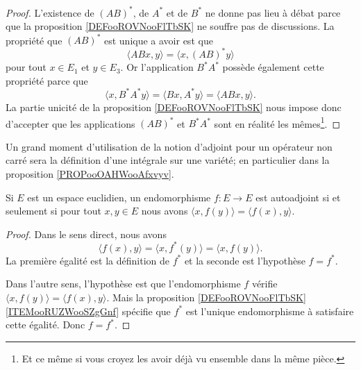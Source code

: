 \begin{proof}
	L'existence de \( (AB)^*\), de \( A^*\) et de \( B^*\) ne donne pas lieu à débat parce que la proposition \ref{DEFooROVNooFlTbSK} ne souffre pas de discussions. La propriété que \( (AB)^*\) est unique a avoir est que
	\begin{equation}
		\langle ABx, y\rangle =\langle x, (AB)^*y\rangle
	\end{equation}
	pour tout \( x\in E_1\) et \( y\in E_3\). Or l'application \( B^*A^*\) possède également cette propriété parce que
	\begin{equation}
		\langle x, B^*A^*y\rangle =\langle Bx, A^*y\rangle =\langle ABx, y\rangle .
	\end{equation}
	La partie unicité de la proposition \ref{DEFooROVNooFlTbSK} nous impose donc d'accepter que les applications \( (AB)^*\) et \( B^*A^*\) sont en réalité les mêmes\footnote{Et ce même si vous croyez les avoir déjà vu ensemble dans la même pièce.}.
\end{proof}

\begin{normaltext}
	Un grand moment d'utilisation de la notion d'adjoint pour un opérateur non carré sera la définition d'une intégrale sur une variété; en particulier dans la proposition \ref{PROPooOAHWooAfxvyv}.
\end{normaltext}

\begin{lemma}
	Si \( E\) est un espace euclidien, un endomorphisme \( f\colon E\to E\) est autoadjoint si et seulement si pour tout \( x,y\in E\) nous avons \( \langle x, f(y)\rangle=\langle f(x), y\rangle  \).
\end{lemma}

\begin{proof}
	Dans le sens direct, nous avons
	\begin{equation}
		\langle f(x), y\rangle =\langle x, f^*(y)\rangle =\langle x, f(y)\rangle .
	\end{equation}
	La première égalité est la définition de \( f^*\) et la seconde est l'hypothèse \( f=f^*\).

	Dans l'autre sens, l'hypothèse est que l'endomorphisme \( f\) vérifie \( \langle x, f(y)\rangle =\langle f(x), y\rangle \). Mais la proposition \ref{DEFooROVNooFlTbSK}\ref{ITEMooRUZWooSZgGnf} spécifie que \( f^*\) est l'unique endomorphisme à satisfaire cette égalité. Donc \( f=f^*\).
\end{proof}

